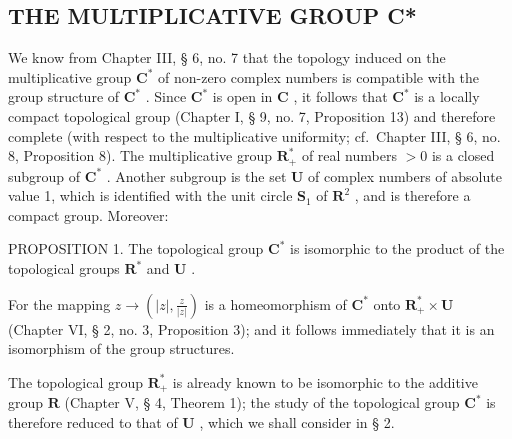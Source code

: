 \subsection{THE MULTIPLICATIVE GROUP C*}

We know from Chapter III, § 6, no. 7 that the topology induced on the multiplicative group \(\mathbf{C}^*\) of non-zero complex numbers is compatible with the group structure of \(\mathbf{C}^*\) . Since \(\mathbf{C}^*\) is open in \(\mathbf{C}\) , it follows that \(\mathbf{C}^*\) is a locally compact topological group (Chapter I, § 9, no. 7, Proposition 13) and therefore complete (with respect to the multiplicative uniformity; cf.~Chapter III, § 6, no. 8, Proposition 8). The multiplicative group \(\mathbf{R}_+^*\) of real numbers \(>0\) is a closed subgroup of \(\mathbf{C}^*\) . Another subgroup is the set \(\mathbf{U}\) of complex numbers of absolute value 1, which is identified with the unit circle \(\mathbf{S}_1\) of \(\mathbf{R}^2\) , and is therefore a compact group. Moreover:

PROPOSITION 1. The topological group \(\mathbf{C}^*\) is isomorphic to the product of the topological groups \(\mathbf{R}^*\) and \(\mathbf{U}\) .

For the mapping \(z \to \left( |z|, \frac{z}{|z|} \right)\) is a homeomorphism of \(\mathbf{C}^*\) onto \(\mathbf{R}_+^* \times \mathbf{U}\) (Chapter VI, § 2, no. 3, Proposition 3); and it follows immediately that it is an isomorphism of the group structures.

The topological group \(\mathbf{R}_{+}^{*}\) is already known to be isomorphic to the additive group \(\mathbf{R}\) (Chapter V, § 4, Theorem 1); the study of the topological group \(\mathbf{C}^{*}\) is therefore reduced to that of \(\mathbf{U}\) , which we shall consider in § 2.

